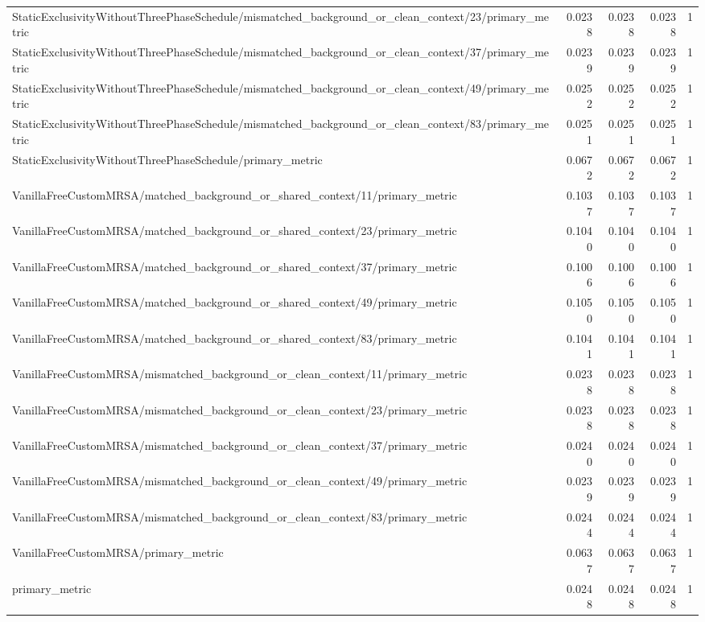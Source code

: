 \begin{table}[h]
\begin{tabular}{lrrrr}
StaticExclusivityWithoutThreePhaseSchedule/mismatched_background_or_clean_context/23/primary_metric & 0.0238 & 0.0238 & 0.0238 & 1 \\
StaticExclusivityWithoutThreePhaseSchedule/mismatched_background_or_clean_context/37/primary_metric & 0.0239 & 0.0239 & 0.0239 & 1 \\
StaticExclusivityWithoutThreePhaseSchedule/mismatched_background_or_clean_context/49/primary_metric & 0.0252 & 0.0252 & 0.0252 & 1 \\
StaticExclusivityWithoutThreePhaseSchedule/mismatched_background_or_clean_context/83/primary_metric & 0.0251 & 0.0251 & 0.0251 & 1 \\
StaticExclusivityWithoutThreePhaseSchedule/primary_metric & 0.0672 & 0.0672 & 0.0672 & 1 \\
VanillaFreeCustomMRSA/matched_background_or_shared_context/11/primary_metric & 0.1037 & 0.1037 & 0.1037 & 1 \\
VanillaFreeCustomMRSA/matched_background_or_shared_context/23/primary_metric & 0.1040 & 0.1040 & 0.1040 & 1 \\
VanillaFreeCustomMRSA/matched_background_or_shared_context/37/primary_metric & 0.1006 & 0.1006 & 0.1006 & 1 \\
VanillaFreeCustomMRSA/matched_background_or_shared_context/49/primary_metric & 0.1050 & 0.1050 & 0.1050 & 1 \\
VanillaFreeCustomMRSA/matched_background_or_shared_context/83/primary_metric & 0.1041 & 0.1041 & 0.1041 & 1 \\
VanillaFreeCustomMRSA/mismatched_background_or_clean_context/11/primary_metric & 0.0238 & 0.0238 & 0.0238 & 1 \\
VanillaFreeCustomMRSA/mismatched_background_or_clean_context/23/primary_metric & 0.0238 & 0.0238 & 0.0238 & 1 \\
VanillaFreeCustomMRSA/mismatched_background_or_clean_context/37/primary_metric & 0.0240 & 0.0240 & 0.0240 & 1 \\
VanillaFreeCustomMRSA/mismatched_background_or_clean_context/49/primary_metric & 0.0239 & 0.0239 & 0.0239 & 1 \\
VanillaFreeCustomMRSA/mismatched_background_or_clean_context/83/primary_metric & 0.0244 & 0.0244 & 0.0244 & 1 \\
VanillaFreeCustomMRSA/primary_metric & 0.0637 & 0.0637 & 0.0637 & 1 \\
primary_metric & 0.0248 & 0.0248 & 0.0248 & 1 \\
\hline
\end{tabular}
\end{table}